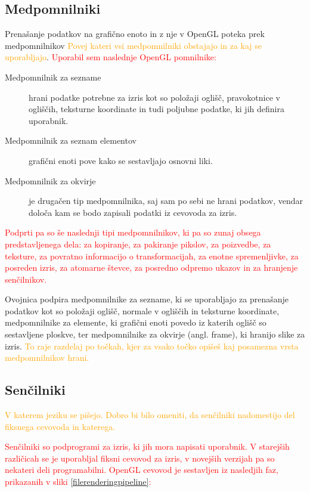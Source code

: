 \documentclass[a4paper, 12pt]{book}
\begin{document}
\subsection*{Medpomnilniki}

Prenašanje podatkov na grafično enoto in z nje v OpenGL poteka prek medpomnilnikov \textcolor{orange}{Povej kateri vsi medpomnilniki obstajajo in za kaj se uporabljajo}. \textcolor{red}{Uporabil sem naslednje OpenGL pomnilnike:}
\begin{description}

\item[Medpomnilnik za sezname] hrani podatke potrebne za izris kot so položaji oglišč, pravokotnice v ogliščih, teksturne koordinate in tudi poljubne podatke, ki jih definira uporabnik.

\item [Medpomnilnik za seznam elementov] grafični enoti pove kako se sestavljajo osnovni liki.

\item [Medpomnilnik za okvirje] je drugačen tip medpomnilnika, saj sam po sebi ne hrani podatkov, vendar določa kam se bodo zapisali podatki iz cevovoda za izris.

\end{description}
\textcolor{red}{Podprti pa so še naslednji tipi medpomnilnikov, ki pa so zunaj obsega predstavljenega dela: za kopiranje, za pakiranje pikslov, za poizvedbe, za teksture, za povratno informacijo o transformacijah, za enotne spremenljivke, za posreden izris, za atomarne števce, za posredno odpremo ukazov in za hranjenje senčilnikov.}


Ovojnica podpira medpomnilnike za sezname, ki se uporabljajo za prenašanje podatkov kot so položaji oglišč, normale v ogliščih in teksturne koordinate, medpomnilnike za elemente, ki grafični enoti povedo iz katerih oglišč so sestavljene ploskve, ter medpomnilnike za okvirje (angl. frame), ki hranijo slike za izris. \textcolor{orange}{To raje razdelaj po točkah, kjer za vsako točko opišeš kaj posamezna vrsta medpomnilnikov hrani.}

\subsection*{Senčilniki}

\textcolor{orange}{V katerem jeziku se pišejo. Dobro bi bilo omeniti, da senčilniki nadomestijo del fiksnega cevovoda in katerega.}

\textcolor{red}{Senčilniki so podprogrami za izris, ki jih mora napisati uporabnik. V starejših različicah se je uporabljal fiksni cevovod za izris, v novejših verzijah pa so nekateri deli programabilni. OpenGL cevovod je sestavljen iz nasledjih faz, prikazanih v sliki \ref{filerenderingpipeline}:}
\end{document}

